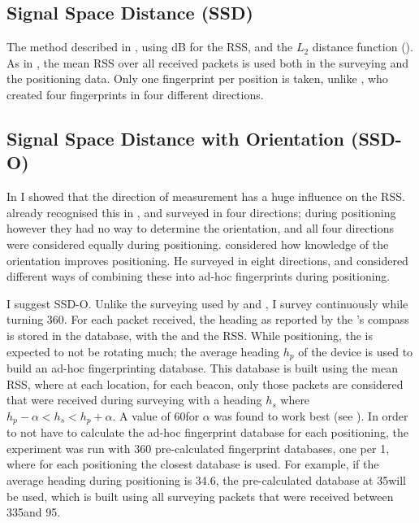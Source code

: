 \subsection{Signal Space Distance (SSD)}
The method described in \citet{bahl2000radar}, using dB for the RSS, and the $L_2$ distance function ().
As in \citet{bahl2000radar}, the mean RSS over all received packets is used both in the surveying and the positioning data.
Only one fingerprint per position is taken, unlike \citet{bahl2000radar}, who created four fingerprints in four different directions.

\subsection{Signal Space Distance with Orientation (SSD-O)}
\label{sec:architecture-ssd-o}
In  I showed that the direction of measurement has a huge influence on the RSS.
\citet{bahl2000radar} already recognised this in \wifi, and surveyed in four directions; during positioning however they had no way to determine the orientation, and all four directions were considered equally during positioning.
\citet{king2006compass} considered how knowledge of the orientation improves positioning.
He surveyed in eight directions, and considered different ways of combining these into ad-hoc fingerprints during positioning.

I suggest SSD-O.
Unlike the \wifi surveying used by \citet{bahl2000radar} and \citet{king2006compass}, I survey continuously while turning 360\textdegree.
For each packet received, the heading as reported by the \device's compass is stored in the database, with the \bid and the RSS.
While positioning, the \device is expected to not be rotating much; the average heading $h_p$ of the device is used to build an ad-hoc fingerprinting database.
This database is built using the mean RSS, where at each location, for each beacon, only those packets are considered that were received during surveying with a heading $h_s$ where $h_p - \alpha < h_s < h_p + \alpha$.
A value of 60\textdegree for $\alpha$ was found to work best (see ).
In order to not have to calculate the ad-hoc fingerprint database for each positioning, the experiment was run with 360 pre-calculated fingerprint databases, one per 1\textdegree, where for each positioning the closest database is used.
For example, if the average heading during positioning is 34.6\textdegree, the pre-calculated database at 35\textdegree will be used, which is built using all surveying packets that were received between 335\textdegree and 95\textdegree.

